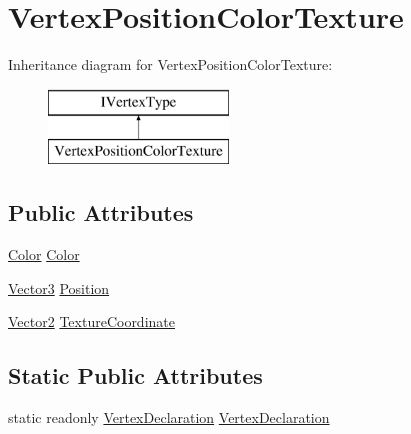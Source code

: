 \hypertarget{structMicrosoft_1_1Xna_1_1Framework_1_1Graphics_1_1VertexPositionColorTexture}{}\section{Vertex\+Position\+Color\+Texture}
\label{structMicrosoft_1_1Xna_1_1Framework_1_1Graphics_1_1VertexPositionColorTexture}
Inheritance diagram for Vertex\+Position\+Color\+Texture\+:\begin{figure}[H]
\begin{center}
\leavevmode
\includegraphics[height=2.000000cm]{structMicrosoft_1_1Xna_1_1Framework_1_1Graphics_1_1VertexPositionColorTexture}
\end{center}
\end{figure}
\subsection*{Public Attributes}
\begin{DoxyCompactItemize}
\item 
\hyperlink{structMicrosoft_1_1Xna_1_1Framework_1_1Color}{Color} \hyperlink{structMicrosoft_1_1Xna_1_1Framework_1_1Graphics_1_1VertexPositionColorTexture_a56bde2e57a33eeee68015a7be51fc825}{Color}
\item 
\hyperlink{structMicrosoft_1_1Xna_1_1Framework_1_1Vector3}{Vector3} \hyperlink{structMicrosoft_1_1Xna_1_1Framework_1_1Graphics_1_1VertexPositionColorTexture_a1a9a536dcc6338f318a4a3f4f146d28b}{Position}
\item 
\hyperlink{structMicrosoft_1_1Xna_1_1Framework_1_1Vector2}{Vector2} \hyperlink{structMicrosoft_1_1Xna_1_1Framework_1_1Graphics_1_1VertexPositionColorTexture_a3ecac5daae340ea5686135f512737324}{Texture\+Coordinate}
\end{DoxyCompactItemize}
\subsection*{Static Public Attributes}
\begin{DoxyCompactItemize}
\item 
static readonly \hyperlink{classMicrosoft_1_1Xna_1_1Framework_1_1Graphics_1_1VertexDeclaration}{Vertex\+Declaration} \hyperlink{structMicrosoft_1_1Xna_1_1Framework_1_1Graphics_1_1VertexPositionColorTexture_a6682796df1bdc96bbd01b50087f976c4}{Vertex\+Declaration}
\end{DoxyCompactItemize}


